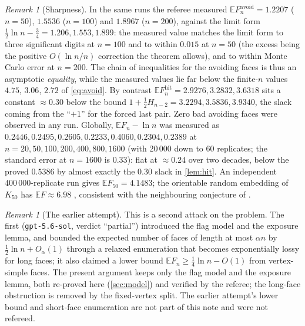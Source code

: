 \documentclass[11pt,a4paper]{article}
\theoremstyle{plain}
\theoremstyle{definition}
\theoremstyle{remark}
\newtheorem{remark}[theorem]{Remark}
\newcommand{\E}{\mathbb E}
\newcommand{\Fhit}{F_n^{\mathrm{hit}}}
\newcommand{\Favoid}{F_n^{\mathrm{avoid}}}
\begin{document}
\begin{remark}[Sharpness]\label{rem:sharp}
In the same runs the referee measured $\E\Favoid=1.2207$ ($n=50$), $1.5536$ ($n=100$) and $1.8967$ ($n=200$), against the limit form $\frac12\ln n-\frac34=1.206,1.553,1.899$: the measured value matches the limit form to three significant digits at $n=100$ and to within $0.015$ at $n=50$ (the excess being the positive $O(\ln n/n)$ correction the theorem allows), and to within Monte Carlo error at $n=200$. The chain of inequalities for the avoiding faces is thus an asymptotic \emph{equality}, while the measured values lie far below the finite-$n$ values $4.75$, $3.06$, $2.72$ of \eqref{eq:avoid}. By contrast $\E\Fhit=2.9276,3.2832,3.6318$ sits a constant $\approx0.30$ below the bound $1+\frac12H_{n-2}=3.2294,3.5836,3.9340$, the slack coming from the ``$+1$'' for the forced last pair. Zero bad avoiding faces were observed in any run. Globally, $\E F_n-\ln n$ was measured as $0.2446,0.2495,0.2605,0.2233,0.4060,0.2304,0.2389$ at $n=20,50,100,200,400,800,1600$ (with $20\,000$ down to $60$ replicates; the standard error at $n=1600$ is $0.33$): flat at $\approx0.24$ over two decades, below the proved $0.5386$ by almost exactly the $0.30$ slack in \cref{lem:hit}. An independent $400\,000$-replicate run gives $\E F_{50}=4.1483$; the orientable random embedding of $K_{50}$ has $\E F\approx6.98$ \cite{Note02}, consistent with the neighbouring conjecture of \cite[Section~9]{CHMMS}.
\end{remark}

\begin{remark}[The earlier attempt]\label{rem:earlier}
This is a second attack on the problem. The first (\texttt{gpt-5.6-sol}, verdict ``partial'') introduced the flag model and the exposure lemma, and bounded the expected number of faces of length at most $\alpha n$ by $\frac12\ln n+O_\alpha(1)$ through a relaxed enumeration that becomes exponentially lossy for long faces; it also claimed a lower bound $\E F_n\ge\frac14\ln n-O(1)$ from vertex-simple faces. The present argument keeps only the flag model and the exposure lemma, both re-proved here (\cref{sec:model}) and verified by the referee; the long-face obstruction is removed by the fixed-vertex split. The earlier attempt's lower bound and short-face enumeration are not part of this note and were not refereed.
\end{remark}
\end{document}
